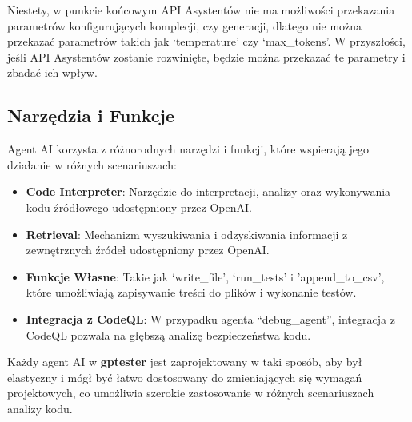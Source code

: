 Niestety, w punkcie końcowym API Asystentów nie ma możliwości przekazania parametrów konfigurujących komplecji, czy generacji, dlatego nie można przekazać parametrów takich jak `temperature' czy `max\_tokens'. W przyszłości, jeśli API Asystentów zostanie rozwinięte, będzie można przekazać te parametry i zbadać ich wpływ.
\subsection{Narzędzia i Funkcje}

Agent AI korzysta z różnorodnych narzędzi i funkcji, które wspierają jego działanie w różnych scenariuszach:

\begin{itemize}
    \item \textbf{Code Interpreter}: Narzędzie do interpretacji, analizy oraz wykonywania kodu źródłowego udostępniony przez OpenAI.
    \item \textbf{Retrieval}: Mechanizm wyszukiwania i odzyskiwania informacji z zewnętrznych źródeł udostępniony przez OpenAI.
    \item \textbf{Funkcje Własne}: Takie jak `write\_file', `run\_tests' i 'append\_to\_csv', które umożliwiają zapisywanie treści do plików i wykonanie testów.
    \item \textbf{Integracja z CodeQL}: W przypadku agenta ``debug\_agent'', integracja z CodeQL pozwala na głębszą analizę bezpieczeństwa kodu.
\end{itemize}


Każdy agent AI w \textbf{gptester} jest zaprojektowany w taki sposób, aby był elastyczny i mógł być łatwo dostosowany do zmieniających się wymagań projektowych, co umożliwia szerokie zastosowanie w różnych scenariuszach analizy kodu.


